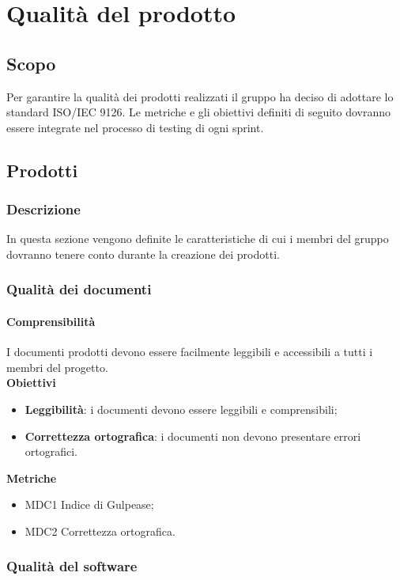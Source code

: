 \section{Qualità del prodotto}
\subsection{Scopo}
Per garantire la qualità dei prodotti realizzati il gruppo \gruppo{} ha deciso di adottare lo standard ISO/IEC 9126.
Le metriche e gli obiettivi definiti di seguito dovranno essere integrate nel processo di testing di ogni sprint.
\subsection{Prodotti}
\subsubsection{Descrizione}
In questa sezione vengono definite le caratteristiche di cui i membri del gruppo \gruppo{} dovranno tenere conto durante la creazione dei prodotti.
\subsubsection{Qualità dei documenti}

\paragraph{Comprensibilità}
I documenti prodotti devono essere facilmente leggibili e accessibili a tutti i membri del progetto. \\

\textbf{Obiettivi}
\begin{itemize}
\item \textbf{Leggibilità}: i documenti devono essere leggibili e comprensibili;
\item \textbf{Correttezza ortografica}: i documenti non devono presentare errori ortografici.
\end{itemize}

\textbf{Metriche}
\begin{itemize}
\item MDC1 Indice di Gulpease;
\item MDC2 Correttezza ortografica.
\end{itemize}

\subsubsection{Qualità del software}

